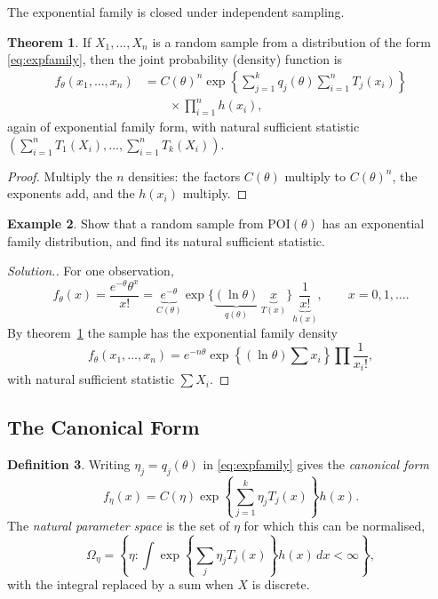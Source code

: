 \documentclass[12pt,a4paper]{report}
\theoremstyle{definition}
\newtheorem{thm}{Theorem}[section]
\newtheorem{defn}[thm]{Definition}
\newtheorem{exa}[thm]{Example}
\newenvironment{solution}
  {\renewcommand{\qedsymbol}{}\begin{proof}[\textit{Solution}.]}
  {\end{proof}}
\begin{document}
The exponential family is closed under independent sampling.

\begin{thm}
\label{thm:expfamilysample}
If $X_1, \dots, X_n$ is a random sample from a distribution of the form
\eqref{eq:expfamily}, then the joint probability (density) function is
\begin{align*}
f_\theta(x_1, \dots, x_n) &= C(\theta)^n\exp\left\{\sum^k_{j = 1} q_j(\theta)\sum^n_{i = 1} T_j(x_i)\right\}\\
&\qquad\times\prod^n_{i = 1}h(x_i),
\end{align*}
again of exponential family form, with natural sufficient statistic
$\left(\sum_{i=1}^n T_1(X_i), \dots, \sum_{i=1}^n T_k(X_i)\right)$.
\end{thm}

\begin{proof}
Multiply the $n$ densities: the factors $C(\theta)$ multiply to $C(\theta)^n$, the
exponents add, and the $h(x_i)$ multiply.
\end{proof}

\begin{exa}
\label{ex:poissonexpfamily}
Show that a random sample from $\text{POI}(\theta)$ has an exponential family
distribution, and find its natural sufficient statistic.
\end{exa}

\begin{solution}
For one observation,
\[f_\theta(x) = \frac{e^{-\theta}\theta^x}{x!} = \underbrace{e^{-\theta}}_{C(\theta)}\exp\{\underbrace{(\ln\theta)}_{q(\theta)}\,\underbrace{x}_{T(x)}\}\underbrace{\frac{1}{x!}}_{h(x)},\qquad x = 0, 1, \dots .\]
By theorem~\ref{thm:expfamilysample} the sample has the exponential family density
\[f_\theta(x_1, \dots, x_n) = e^{-n\theta}\exp\left\{(\ln\theta)\sum x_i\right\}\prod\frac{1}{x_i!},\]
with natural sufficient statistic $\sum X_i$.
\end{solution}

\subsection{The Canonical Form}

\begin{defn}
\label{def:canonical}
Writing $\eta_j = q_j(\theta)$ in \eqref{eq:expfamily} gives the \emph{canonical form}
\[f_\eta(x) = C(\eta)\exp\left\{\sum^k_{j = 1}\eta_jT_j(x)\right\}h(x) .\]
The \emph{natural parameter space} is the set of $\eta$ for which this can be
normalised,
\[\Omega_\eta = \left\{\eta : \int\exp\left\{\sum_j\eta_jT_j(x)\right\}h(x)\,dx<\infty\right\},\]
with the integral replaced by a sum when $X$ is discrete.
\end{defn}
\end{document}
